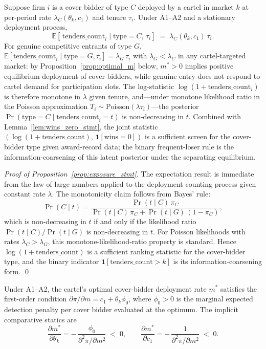 \begin{proposition}\label{prop:exposure_stmt}
Suppose firm $i$ is a cover bidder of type $C$ deployed by a
cartel in market $k$ at per-period rate
$\lambda_C(\theta_k, c_1)$ and tenure $\tau_i$. Under A1--A2 and a
stationary deployment process,
\[
  \mathbb{E}\!\left[\,\text{tenders\_count}_i \mid
                   \text{type}=C,\,\tau_i\right]
  \;=\; \lambda_C(\theta_k, c_1)\,\tau_i.
\]
For genuine competitive entrants of type $G$,
$\mathbb{E}[\text{tenders\_count}_i \mid \text{type}=G, \tau_i]
= \lambda_G\,\tau_i$ with $\lambda_G < \lambda_C$ in any
cartel-targeted market: by Proposition~\ref{prop:optimal_m}
below, $m^* > 0$ implies positive equilibrium deployment of
cover bidders, while genuine entry does not respond to cartel
demand for participation slots. The log-statistic
$\log(1+\text{tenders\_count}_i)$ is therefore monotone in
$\lambda$ given tenure, and---under monotone likelihood ratio in
the Poisson approximation
$T_i \sim \mathrm{Poisson}(\lambda \tau_i)$---the posterior
$\Pr(\text{type}=C \mid \text{tenders\_count}_i = t)$ is
non-decreasing in $t$. Combined with
Lemma~\ref{lem:wins_zero_stmt}, the joint statistic
$(\log(1+\text{tenders\_count}),\,\mathbf{1}[\text{wins}=0])$ is
a sufficient screen for the cover-bidder type given award-record
data; the binary frequent-loser rule is the information-coarsening
of this latent posterior under the separating equilibrium.
\end{proposition}

\begin{proof}[Proof of Proposition~\ref{prop:exposure_stmt}]
The expectation result is immediate from the law of large
numbers applied to the deployment counting process given
constant rate $\lambda$. The monotonicity claim follows from
Bayes' rule:
\[
  \Pr(C \mid t) =
  \frac{\Pr(t \mid C)\,\pi_C}
       {\Pr(t \mid C)\,\pi_C + \Pr(t \mid G)\,(1-\pi_C)},
\]
which is non-decreasing in $t$ if and only if the likelihood
ratio $\Pr(t \mid C)/\Pr(t \mid G)$ is non-decreasing in $t$.
For Poisson likelihoods with rates $\lambda_C > \lambda_G$, this
monotone-likelihood-ratio property is standard. Hence
$\log(1+\text{tenders\_count})$ is a sufficient ranking statistic
for the cover-bidder type, and the binary indicator
$\mathbf{1}[\text{tenders\_count} > k]$ is its
information-coarsening form. \qed
\end{proof}

\begin{proposition}\label{prop:optimal_m}
Under A1--A2, the cartel's optimal cover-bidder deployment rate
$m^*$ satisfies the first-order condition
$\partial \pi / \partial m = c_1 + \theta_k \phi_0$, where
$\phi_0 > 0$ is the marginal expected detection penalty per
cover bidder evaluated at the optimum. The implicit comparative
statics are
\[
  \frac{\partial m^*}{\partial \theta_k}
  = -\,\frac{\phi_0}{\partial^2 \pi / \partial m^2} \;<\; 0,
  \qquad
  \frac{\partial m^*}{\partial c_1}
  = -\,\frac{1}{\partial^2 \pi / \partial m^2} \;<\; 0.
\]
\end{proposition}


